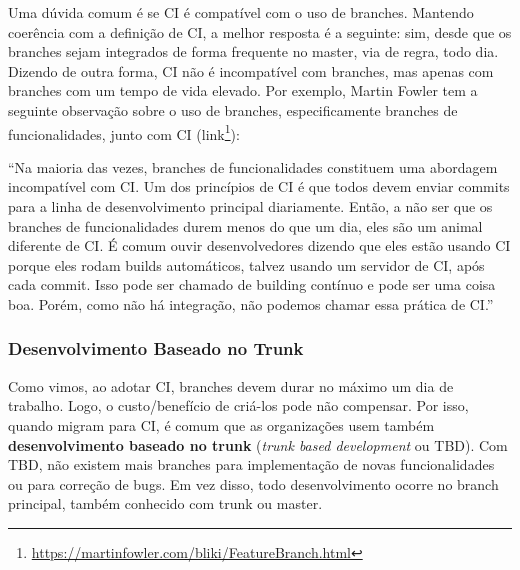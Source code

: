 \documentclass[
  11pt,
  twoside]{book}
\DeclareRobustCommand{\href}[2]{#2\footnote{\url{#1}}}
\renewenvironment{quote}{\centering \vspace{1.5ex} \begin{tcolorbox}[colback=backcolor, width=4.9in]}{\end{tcolorbox}}
\begin{document}
Uma dúvida comum é se CI é compatível com o uso de branches. Mantendo
coerência com a definição de CI, a melhor resposta é a seguinte: sim,
desde que os branches sejam integrados de forma frequente no master, via
de regra, todo dia. Dizendo de outra forma, CI não é incompatível com
branches, mas apenas com branches com um tempo de vida elevado. Por
exemplo, Martin Fowler tem a seguinte observação sobre o uso de
branches, especificamente branches de funcionalidades, junto com CI
(\href{https://martinfowler.com/bliki/FeatureBranch.html}{link}):


\begin{quote}
``Na maioria das vezes, branches de funcionalidades constituem uma
abordagem incompatível com CI. Um dos princípios de CI é que todos devem
enviar commits para a linha de desenvolvimento principal diariamente.
Então, a não ser que os branches de funcionalidades durem menos do que
um dia, eles são um animal diferente de CI. É comum ouvir
desenvolvedores dizendo que eles estão usando CI porque eles rodam
builds automáticos, talvez usando um servidor de CI, após cada commit.
Isso pode ser chamado de building contínuo e pode ser uma coisa boa.
Porém, como não há integração, não podemos chamar essa prática de CI.''
\end{quote}

\hypertarget{desenvolvimento-baseado-no-trunk}{%
\subsubsection*{Desenvolvimento Baseado no
Trunk}\label{desenvolvimento-baseado-no-trunk}}

 

Como vimos, ao adotar CI, branches devem durar no máximo um dia de
trabalho. Logo, o custo/benefício de criá-los pode não compensar. Por
isso, quando migram para CI, é comum que as organizações usem também
\textbf{desenvolvimento baseado no trunk} (\emph{trunk based
development} ou TBD). Com TBD, não existem mais branches para
implementação de novas funcionalidades ou para correção de bugs. Em vez
disso, todo desenvolvimento ocorre no branch principal, também conhecido
com trunk ou master.
\end{document}
